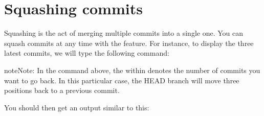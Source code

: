\documentclass[a4paper,10pt,english,openany,oneside]{sphinxmanual}
\begin{document}
\section{Squashing commits}
\label{\detokenize{gitinminutes:squashing-commits}}
\sphinxAtStartPar
Squashing is the act of merging multiple commits into a single one. You can squash commits at any time with the  feature.
For instance, to display the three latest commits, we will type the following command:

\begin{sphinxVerbatim}[commandchars=\\\{\}]
   
\end{sphinxVerbatim}

\begin{sphinxadmonition}{note}{Note:}
\sphinxAtStartPar
In the command above, the  within  denotes the number of commits you want to go back. In this particular case, the HEAD branch will move three positions back to a previous commit.
\end{sphinxadmonition}

\sphinxAtStartPar
You should then get an output similar to this:
\end{document}
